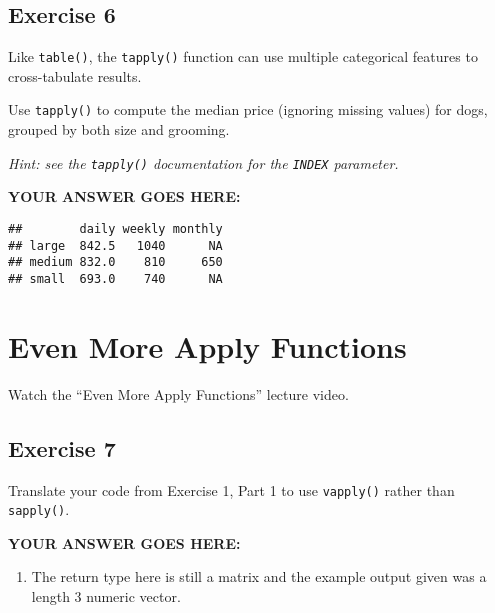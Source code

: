\documentclass[
]{article}
\newenvironment{Shaded}{\begin{snugshade}}{\end{snugshade}}
\newcommand{\DataTypeTok}[1]{\textcolor[rgb]{0.13,0.29,0.53}{#1}}
\newcommand{\KeywordTok}[1]{\textcolor[rgb]{0.13,0.29,0.53}{\textbf{#1}}}
\newcommand{\NormalTok}[1]{#1}
\newcommand{\OperatorTok}[1]{\textcolor[rgb]{0.81,0.36,0.00}{\textbf{#1}}}
\newcommand{\OtherTok}[1]{\textcolor[rgb]{0.56,0.35,0.01}{#1}}
\providecommand{\tightlist}{%
  \setlength{\itemsep}{0pt}\setlength{\parskip}{0pt}}
\begin{document}
\hypertarget{exercise-6}{%
\subsection{Exercise 6}\label{exercise-6}}

Like \texttt{table()}, the \texttt{tapply()} function can use multiple
categorical features to cross-tabulate results.

Use \texttt{tapply()} to compute the median price (ignoring missing
values) for dogs, grouped by both size and grooming.

\emph{Hint: see the \texttt{tapply()} documentation for the
\texttt{INDEX} parameter.}

\textbf{YOUR ANSWER GOES HERE:}

\begin{Shaded}
\end{Shaded}

\begin{verbatim}
##        daily weekly monthly
## large  842.5   1040      NA
## medium 832.0    810     650
## small  693.0    740      NA
\end{verbatim}

\hypertarget{even-more-apply-functions}{%
\section{Even More Apply Functions}\label{even-more-apply-functions}}

Watch the ``Even More Apply Functions'' lecture video.

\hypertarget{exercise-7}{%
\subsection{Exercise 7}\label{exercise-7}}

Translate your code from Exercise 1, Part 1 to use \texttt{vapply()}
rather than \texttt{sapply()}.

\textbf{YOUR ANSWER GOES HERE:}

\begin{enumerate}
\def\labelenumi{\arabic{enumi}.}
\tightlist
\item
  The return type here is still a matrix and the example output given
  was a length 3 numeric vector.
\end{enumerate}
\end{document}
